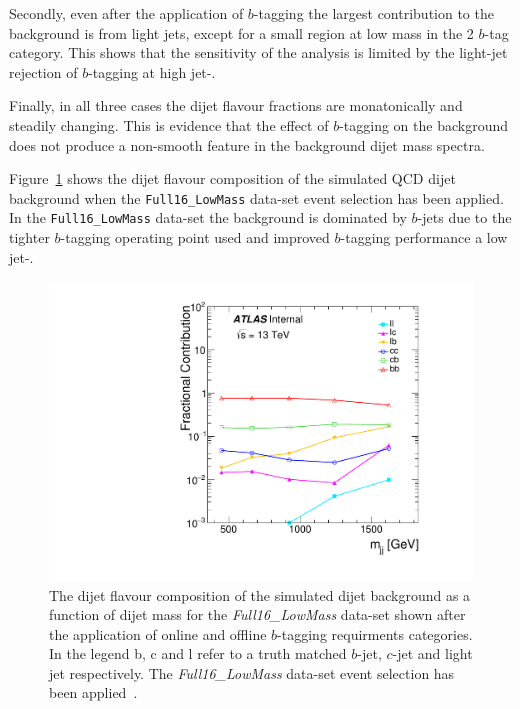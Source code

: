 Secondly, even after the application of $b$-tagging the largest contribution to the background is from light jets,
except for a small region at low mass in the 2 $b$-tag category.
This shows that the sensitivity of the analysis is limited by the
light-jet rejection of $b$-tagging at high jet-\pT.

Finally, in all three cases the dijet flavour fractions are monatonically and steadily changing.
This is evidence that the effect of $b$-tagging on the background does not produce
a non-smooth feature in the background dijet mass spectra.

Figure~\ref{fig:evt-lowmass_flavcomp} shows the dijet flavour composition of the simulated QCD dijet background
when the \verb|Full16_LowMass| data-set event selection has been applied.
In the \verb|Full16_LowMass| data-set the background is dominated by $b$-jets
due to the tighter $b$-tagging operating point used and improved $b$-tagging performance a low jet-\pT.

\begin{figure}[!ht]
  \begin{center}
    \includegraphics[width=0.6\linewidth, angle=0]{figs/Dibjet/LowMass/evt-flavcomp.pdf}
  \end{center}
  \caption[The dijet flavour composition of the simulated dijet background as a function of dijet mass for the \textit{Full16\_LowMass} data-set
    shown after the application of online and offline $b$-tagging requirments categories.
    In the legend b, c and l refer to a truth matched $b$-jet, $c$-jet and light jet respectively.
    The \textit{Full16\_LowMass} data-set event selection has been applied.]
          {The dijet flavour composition of the simulated dijet background as a function of dijet mass for the \textit{Full16\_LowMass} data-set
            shown after the application of online and offline $b$-tagging requirments categories.
            In the legend b, c and l refer to a truth matched $b$-jet, $c$-jet and light jet respectively.
            The \textit{Full16\_LowMass} data-set event selection has been applied~\cite{dibjet-full_int}.}
  \label{fig:evt-lowmass_flavcomp}
\end{figure}

